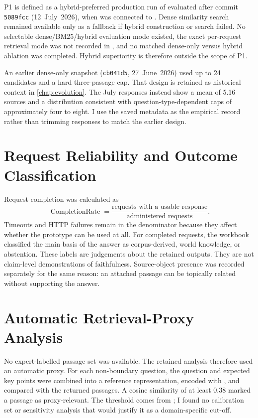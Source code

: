 P1 is defined as a hybrid-preferred production run of  evaluated after commit \texttt{5089fcc} (12~July~2026), when  was connected to . Dense similarity search remained available only as a fallback if hybrid construction or search failed. No selectable dense/BM25/hybrid evaluation mode existed, the exact per-request retrieval mode was not recorded in , and no matched dense-only versus hybrid ablation was completed. Hybrid superiority is therefore outside the scope of P1.

An earlier dense-only snapshot (\texttt{cb041d5}, 27~June~2026) used up to 24 candidates and a hard three-passage cap. That design is retained as historical context in \cref{chap:evolution}. The July responses instead show a mean of 5.16 sources and a distribution consistent with question-type-dependent caps of approximately four to eight. I use the saved metadata as the empirical record rather than trimming responses to match the earlier design.

\section{Request Reliability and Outcome Classification}
\label{sec:reliability-method}

Request completion was calculated as
\[
\operatorname{CompletionRate}=\frac{\text{requests with a usable response}}{\text{administered requests}}.
\]
Timeouts and HTTP failures remain in the denominator because they affect whether the prototype can be used at all. For completed requests, the workbook classified the main basis of the answer as corpus-derived, world knowledge, or abstention. These labels are judgements about the retained outputs. They are not claim-level demonstrations of faithfulness. Source-object presence was recorded separately for the same reason: an attached passage can be topically related without supporting the answer.

\section{Automatic Retrieval-Proxy Analysis}
\label{sec:retrieval-proxy-method}

No expert-labelled passage set was available. The retained analysis therefore used an automatic proxy. For each non-boundary question, the question and expected key points were combined into a reference representation, encoded with , and compared with the returned passages. A cosine similarity of at least 0.38 marked a passage as proxy-relevant. The threshold comes from ; I found no calibration set or sensitivity analysis that would justify it as a domain-specific cut-off.


